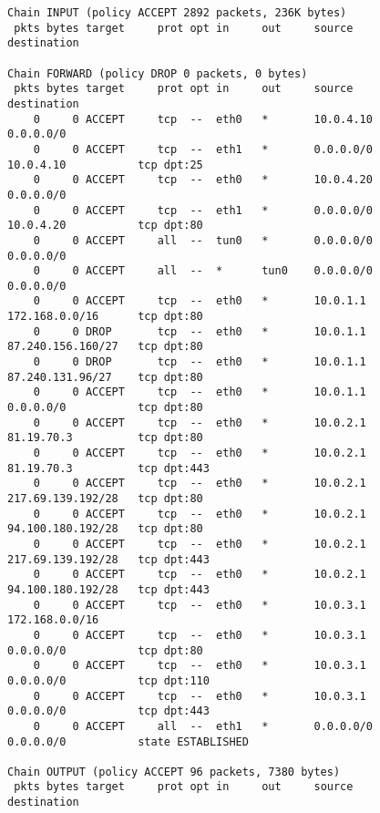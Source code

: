 \documentclass[a4paper,12pt]{article}
\begin{document}
\begin{Verbatim}
Chain INPUT (policy ACCEPT 2892 packets, 236K bytes)
 pkts bytes target     prot opt in     out     source               destination         

Chain FORWARD (policy DROP 0 packets, 0 bytes)
 pkts bytes target     prot opt in     out     source               destination         
    0     0 ACCEPT     tcp  --  eth0   *       10.0.4.10            0.0.0.0/0           
    0     0 ACCEPT     tcp  --  eth1   *       0.0.0.0/0            10.0.4.10           tcp dpt:25 
    0     0 ACCEPT     tcp  --  eth0   *       10.0.4.20            0.0.0.0/0           
    0     0 ACCEPT     tcp  --  eth1   *       0.0.0.0/0            10.0.4.20           tcp dpt:80 
    0     0 ACCEPT     all  --  tun0   *       0.0.0.0/0            0.0.0.0/0           
    0     0 ACCEPT     all  --  *      tun0    0.0.0.0/0            0.0.0.0/0           
    0     0 ACCEPT     tcp  --  eth0   *       10.0.1.1             172.168.0.0/16      tcp dpt:80 
    0     0 DROP       tcp  --  eth0   *       10.0.1.1             87.240.156.160/27   tcp dpt:80 
    0     0 DROP       tcp  --  eth0   *       10.0.1.1             87.240.131.96/27    tcp dpt:80 
    0     0 ACCEPT     tcp  --  eth0   *       10.0.1.1             0.0.0.0/0           tcp dpt:80 
    0     0 ACCEPT     tcp  --  eth0   *       10.0.2.1             81.19.70.3          tcp dpt:80 
    0     0 ACCEPT     tcp  --  eth0   *       10.0.2.1             81.19.70.3          tcp dpt:443 
    0     0 ACCEPT     tcp  --  eth0   *       10.0.2.1             217.69.139.192/28   tcp dpt:80 
    0     0 ACCEPT     tcp  --  eth0   *       10.0.2.1             94.100.180.192/28   tcp dpt:80 
    0     0 ACCEPT     tcp  --  eth0   *       10.0.2.1             217.69.139.192/28   tcp dpt:443 
    0     0 ACCEPT     tcp  --  eth0   *       10.0.2.1             94.100.180.192/28   tcp dpt:443 
    0     0 ACCEPT     tcp  --  eth0   *       10.0.3.1             172.168.0.0/16      
    0     0 ACCEPT     tcp  --  eth0   *       10.0.3.1             0.0.0.0/0           tcp dpt:80 
    0     0 ACCEPT     tcp  --  eth0   *       10.0.3.1             0.0.0.0/0           tcp dpt:110 
    0     0 ACCEPT     tcp  --  eth0   *       10.0.3.1             0.0.0.0/0           tcp dpt:443 
    0     0 ACCEPT     all  --  eth1   *       0.0.0.0/0            0.0.0.0/0           state ESTABLISHED 

Chain OUTPUT (policy ACCEPT 96 packets, 7380 bytes)
 pkts bytes target     prot opt in     out     source               destination
\end{Verbatim}
\end{document}
